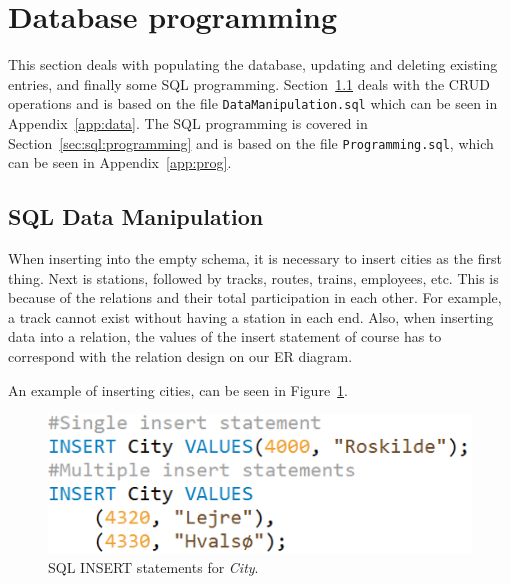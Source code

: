 \section{Database programming}\label{sec:prog}
This section deals with populating the database, updating and deleting existing 
entries, and finally some SQL programming. Section~\ref{sec:manipulate} deals 
with the CRUD operations and is based on the file \verb|DataManipulation.sql| 
which can be seen in Appendix~\ref{app:data}. The SQL programming is covered in 
Section~\ref{sec:sql:programming} and is based on the file 
\verb|Programming.sql|, which can be seen in Appendix~\ref{app:prog}.

\subsection{SQL Data Manipulation} \label{sec:manipulate}
When inserting into the empty schema, it is necessary to insert cities as the 
first thing. Next is stations, followed by tracks, routes, trains, employees, 
etc. This is because of the relations and their total participation in each 
other. For example, a track cannot exist without having a station in each 
end.
Also, when inserting data into a relation, the values of the insert statement 
of course has to correspond with the relation design on our ER diagram.

An example of inserting cities, can  be seen in Figure~\ref{fig:ins:city}.



\begin{figure}[ht!]
    \centering
    \includegraphics[scale=.5]{img/INSERT_Statements}
    \caption{SQL INSERT statements for \emph{City}.}
    \label{fig:ins:city}
\end{figure}

